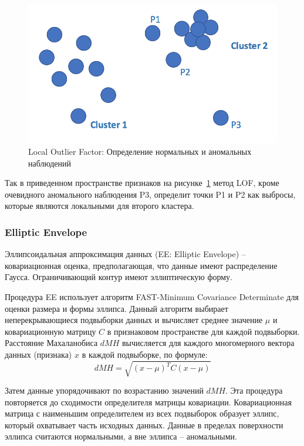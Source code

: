 \documentclass[12pt]{article}
\begin{document}
    \begin{figure}[h!]
        \centering
        \includegraphics[width=0.6\linewidth]{LocalOutlierFactor.png}
        \caption{Local Outlier Factor: Определение нормальных и аномальных наблюдений}
        \label{sec:Research:Model:LocalOutlierFactor:fig:LocalOutlierFactor}
    \end{figure}

    \par Так в приведенном пространстве признаков на рисунке~\ref{sec:Research:Model:LocalOutlierFactor:fig:LocalOutlierFactor} метод LOF, кроме очевидного аномального наблюдения P3, определит точки P1 и P2 как выбросы, которые являются локальными для второго кластера.


    \subsubsection{Elliptic Envelope}
    \label{sec:Research:Model:EllipticEnvelope}

    \par Эллипсоидальная аппроксимация данных (EE: Elliptic Envelope) \cite{EE} -- ковариационная оценка, предполагающая, что данные имеют распределение Гаусса. Ограничивающий контур имеют эллиптическую форму.

    \par Процедура EE использует алгоритм FAST-Minimum Covariance Determinate для оценки размера и формы эллипса. Данный алгоритм выбирает неперекрывающиеся подвыборки данных и вычисляет среднее значение $\mu$ и ковариационную матрицу $C$ в признаковом пространстве для каждой подвыборки. Расстояние Махаланобиса $dMH$ вычисляется для каждого многомерного вектора данных (признака) $x$ в каждой подвыборке, по формуле:
    \begin{equation}
    \label{sec:Research:Model:EllipticEnvelope:formula:MahalanobisDistance}
        dMH = \sqrt{(x-\mu)^T C (x-\mu)}
    \end{equation}

    \noindent Затем данные упорядочивают по возрастанию значений $dMH$. Эта процедура повторяется до сходимости определителя матрицы ковариации. Ковариационная матрица с наименьшим определителем из всех подвыборок образует эллипс, который охватывает часть исходных данных. Данные в пределах поверхности эллипса считаются нормальными, а вне эллипса -- аномальными.
\end{document}
